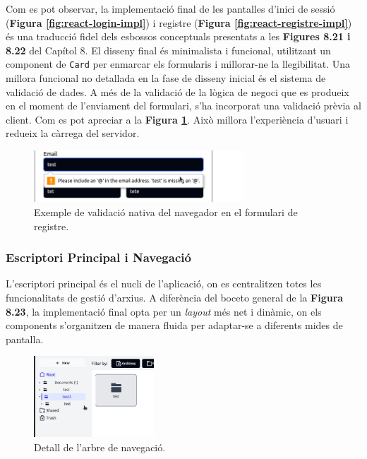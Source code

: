 Com es pot observar, la implementació final de les pantalles d'inici de sessió (\textbf{Figura \ref{fig:react-login-impl}}) i registre (\textbf{Figura \ref{fig:react-registre-impl}}) és una traducció fidel dels esbossos conceptuals presentats a les \textbf{Figures 8.21 i 8.22} del Capítol 8. El disseny final és minimalista i funcional, utilitzant un component de \texttt{Card} per enmarcar els formularis i millorar-ne la llegibilitat. Una millora funcional no detallada en la fase de disseny inicial és el sistema de validació de dades. A més de la validació de la lògica de negoci que es produeix en el moment de l'enviament del formulari, s'ha incorporat una validació prèvia al client. Com es pot apreciar a la \textbf{Figura \ref{fig:react-error-signup-impl}}. Això millora l'experiència d'usuari i redueix la càrrega del servidor.

\begin{figure}[H]
    \centering
    \includegraphics[width=0.7\textwidth]{Figures/ui-web/error_signup.png}
    \caption{Exemple de validació nativa del navegador en el formulari de registre.}
    \label{fig:react-error-signup-impl}
\end{figure}

\subsubsection{Escriptori Principal i Navegació}
L'escriptori principal és el nucli de l'aplicació, on es centralitzen totes les funcionalitats de gestió d'arxius. A diferència del boceto general de la \textbf{Figura 8.23}, la implementació final opta per un \textit{layout} més net i dinàmic, on els components s'organitzen de manera fluida per adaptar-se a diferents mides de pantalla.

\begin{figure}[H]
    \centering
    \includegraphics[width=0.4\textwidth]{Figures/ui-web/Folder_tree.png}
    \caption{Detall de l'arbre de navegació.}
    \label{fig:react-arbre-carpetes-impl}
\end{figure}

